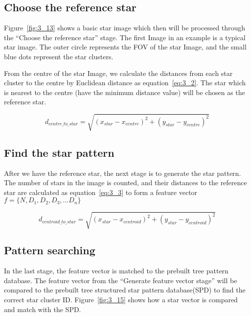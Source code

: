 \subsection{Choose the reference star}

Figure~\ref{fig:3_13} shows a basic star image which then will be processed through the “Choose the reference star” stage. The first Image in an example is a typical star image. The outer circle represents the FOV of the star Image, and the small blue dots represent the star clusters. 


\noindent From the centre of the star Image, we calculate the distances from each star cluster to the centre by Euclidean distance as equation~\ref{eq:3_2}. The star which is nearest to the centre (have the minimum distance value) will be chosen as the reference star.

\begin{equation}
	d_{centre\_to\_star} = \sqrt{(x_{star} - x_{centre})^2 + (y_{star} - y_{centre})^2}
	\label{eq:3_2}
\end{equation}

\subsection{Find the star pattern}

After we have the reference star, the next stage is to generate the star pattern. The number of stars in the image is counted, and their distances to the reference star are calculated as equation~\ref{eq:3_3} to form a feature vector $f = \{N, D_1, D_2, D_3, … D_n\}$

\begin{equation}
	d_{centroid\_to\_star} = \sqrt{(x_{star} - x_{centroid})^2 + (y_{star} - y_{centroid})^2}
	\label{eq:3_3}
\end{equation}


\subsection{Pattern searching}

In the last stage, the feature vector is matched to the prebuilt tree pattern database. The feature vector from the “Generate feature vector stage” will be compared to the prebuilt tree structured star pattern database(SPD) to find the correct star cluster ID. Figure~\ref{fig:3_15} shows how a star vector is compared and match with the SPD. \\

